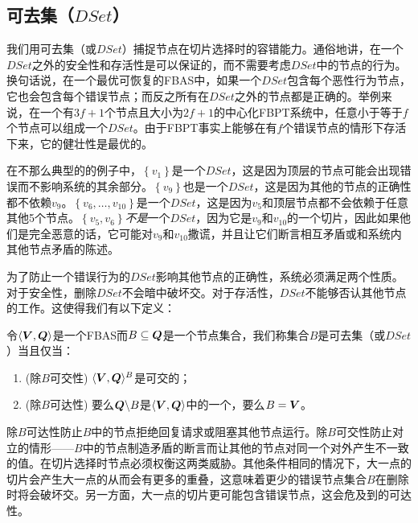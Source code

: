 \subsection{可去集（$DSet$）}
我们用可去集（或$DSet$）捕捉节点在切片选择时的容错能力。通俗地讲，在一个$DSet$之外的安全性和存活性是可以保证的，而不需要考虑$DSet$中的节点的行为。换句话说，在一个最优可恢复的FBAS中，如果一个$DSet$包含每个恶性行为节点，它也会包含每个错误节点；而反之所有在$DSet$之外的节点都是正确的。举例来说，在一个有$3f+1$个节点且{\quorum}大小为$2f+1$的中心化FBPT系统中，任意小于等于$f$个节点可以组成一个$DSet$。由于FBPT事实上能够在有$f$个错误节点的情形下存活下来，它的健壮性是最优的。

在不那么典型的的例子中，$\left\{v_1\right\}$是一个$DSet$，这是因为顶层的节点可能会出现错误而不影响系统的其余部分。$\left\{v_9\right\}$也是一个$DSet$，这是因为其他的节点的正确性都不依赖$v_9$。$\left\{v_6,\ldots,v_{10}\right\}$是一个$DSet$，这是因为$v_5$和顶层节点都不会依赖于任意其他5个节点。$\left\{v_5,v_6\right\}$\textit{不是}一个$DSet$，因为它是$v_9$和$v_{10}$的一个切片，因此如果他们是完全恶意的话，它可能对$v_9$和$v_{10}$撒谎，并且让它们断言相互矛盾或和系统内其他节点矛盾的陈述。

为了防止一个错误行为的$DSet$影响其他节点的正确性，系统必须满足两个性质。对于安全性，删除$DSet$不会暗中破坏{\quorum}交。对于存活性，$DSet$不能够否认其他节点的工作{\quorum}。这使得我们有以下定义：

\begin{definition}[DSet]
        令$\langle{\bm V},{\bm Q}\rangle$是一个FBAS而$B\subseteq {\bm Q}$是一个节点集合，我们称集合$B$是可去集（或$DSet$）当且仅当：
        \begin{enumerate}
                \item (除$B${\quorum}可交性) $\langle{\bm V},{\bm Q}\rangle^{B}$是{\quorum}可交的；
                \item (除$B${\quorum}可达性) 要么${\bm Q}\backslash B$是$\langle{\bm V},{\bm Q}\rangle$中的一个{\quorum}，要么$B={\bm V}$。
        \end{enumerate}
\end{definition}

除$B${\quorum}可达性防止$B$中的节点拒绝回复请求或阻塞其他节点运行。除$B${\quorum}可交性防止对立的情形——$B$中的节点制造矛盾的断言而让其他的节点对同一个{\slot}对外产生不一致的值。在切片选择时节点必须权衡这两类威胁。其他条件相同的情况下，大一点的切片会产生大一点的{\quorum}从而会有更多的重叠，这意味着更少的错误节点集合$B$在删除时将会破坏{\quorum}交。另一方面，大一点的切片更可能包含错误节点，这会危及到{\quorum}的可达性。

